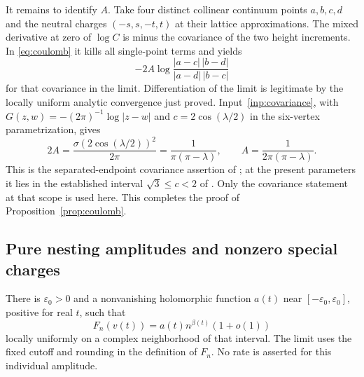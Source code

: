 It remains to identify $A$.  Take four distinct collinear continuum
points $a,b,c,d$ and the neutral charges $(-s,s,-t,t)$ at their lattice
approximations.  The mixed derivative at zero of $\log C$ is minus
the covariance of the two height increments.  In
\eqref{eq:coulomb} it kills all single-point terms and yields
\[
 -2A\log\frac{|a-c|\,|b-d|}{|a-d|\,|b-c|}
\]
for that covariance in the limit.  Differentiation of the limit is
legitimate by the locally uniform analytic convergence just proved.
Input~\ref{inp:covariance}, with
$G(z,w)=-(2\pi)^{-1}\log|z-w|$ and
$c=2\cos(\lambda/2)$ in the six-vertex parametrization, gives
\begin{equation}\label{eq:stiffness}
 2A=\frac{\sigma(2\cos(\lambda/2))^2}{2\pi}
    =\frac{1}{\pi(\pi-\lambda)},
 \qquad A=\frac{1}{2\pi(\pi-\lambda)}.
\end{equation}
This is the separated-endpoint covariance assertion of
\cite[Theorem~1.1, Part~(iii)]{GFFCompanion}; at the present parameters
it lies in the established interval $\sqrt3\le c<2$ of
\cite[Theorem~2.8]{DKLM}.  Only the covariance statement at that scope
is used here.  This completes the proof of
Proposition~\ref{prop:coulomb}.

\subsection{Pure nesting amplitudes and nonzero special charges}

\begin{proposition}\label{prop:pure-nest}
There is $\varepsilon_0>0$ and a nonvanishing holomorphic function
$a(t)$ near $[-\varepsilon_0,\varepsilon_0]$, positive for real $t$,
such that
\[
 F_n(v(t))=a(t)n^{\beta(t)}(1+o(1))
\]
locally uniformly on a complex neighborhood of that interval.
The limit uses the fixed cutoff and rounding in the definition of
$F_n$.  No rate is asserted for this individual amplitude.
\end{proposition}

